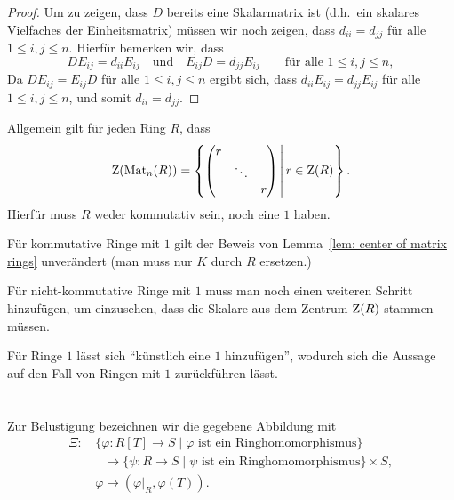 \documentclass[a4paper, 10pt, numbers=noenddot]{scrartcl}
\begin{document}
\begin{proof}
  Um zu zeigen, dass $D$ bereits eine Skalarmatrix ist (d.h.\ ein skalares Vielfaches der Einheitsmatrix) müssen wir noch zeigen, dass $d_{ii} = d_{jj}$ für alle $1 \leq i,j \leq n$.
  Hierfür bemerken wir, dass
  \[
    D E_{ij} = d_{ii} E_{ij}
    \quad\text{und}\quad
    E_{ij} D = d_{jj} E_{ij}
    \qquad
    \text{für alle $1 \leq i,j \leq n$},
  \]
  Da $D E_{ij} = E_{ij} D$ für alle $1 \leq i,j \leq n$ ergibt sich, dass $d_{ii} E_{ij} = d_{jj} E_{ij}$ für alle $1 \leq i,j \leq n$, und somit $d_{ii} = d_{jj}$.
\end{proof}


\begin{remark}
  Allgemein gilt für jeden Ring $R$, dass
  \[
      \operatorname{Z}(\operatorname{Mat}_n(R))
    = \left\{
          \begin{pmatrix}
            r &         &   \\
              & \ddots  &   \\
              &         & r
          \end{pmatrix}
        \,
        \middle|
        \,
          r \in \operatorname{Z}(R)
      \right\}.
  \]
  Hierfür muss $R$ weder kommutativ sein, noch eine $1$ haben.
  
  Für kommutative Ringe mit $1$ gilt der Beweis von Lemma~\ref{lem: center of matrix rings} unverändert (man muss nur $K$ durch $R$ ersetzen.)
  
  Für nicht-kommutative Ringe mit $1$ muss man noch einen weiteren Schritt hinzufügen, um einzusehen, dass die Skalare aus dem Zentrum $\operatorname{Z}(R)$ stammen müssen.
  
  Für Ringe $1$ lässt sich ``künstlich eine $1$ hinzufügen'', wodurch sich die Aussage auf den Fall von Ringen mit $1$ zurückführen lässt.
\end{remark}












\section{}

Zur Belustigung bezeichnen wir die gegebene Abbildung mit
\begin{align*}
              \Xi
  \colon&\,   \{ \varphi  \colon R[T] \to S \mid \text{$\varphi$ ist ein Ringhomomorphismus} \}
  \\
        &\,   \phantom{\varphi} \to \{ \psi \colon R \to S        \mid \text{$\psi$ ist ein Ringhomomorphismus} \}
                                    \times S,
  \\
         &\,  \varphi
  \mapsto     (\varphi|_R, \varphi(T)).
\end{align*}
\end{document}
